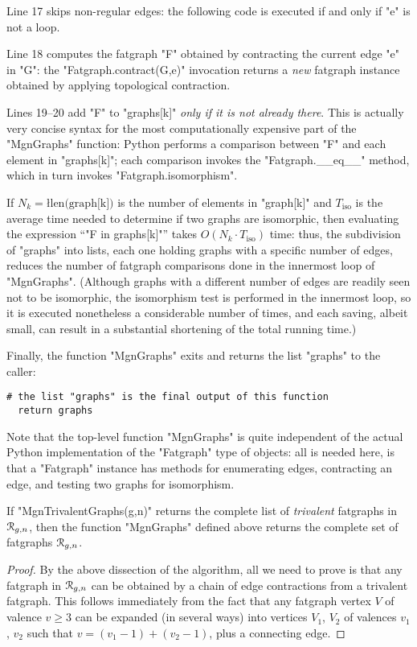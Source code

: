 Line 17 skips non-regular edges: the following code is executed if and
only if "e" is not a loop.

Line 18 computes the fatgraph "F" obtained by contracting the
current edge "e" in "G": the "Fatgraph.contract(G,e)" invocation
returns a \emph{new} fatgraph instance obtained by applying
topological contraction.

Lines 19--20 add "F" to "graphs[k]" \emph{only if it is not
  already there}.  This is actually very concise syntax for the most
computationally expensive part of the "MgnGraphs" function: Python
performs a comparison between "F" and each element in "graphs[k]";
each comparison invokes the "Fatgraph.__eq__" method, which in turn
invokes "Fatgraph.isomorphism".

If $N_k = \text{\l{len(graph[k])}}$ is the number of elements in
"graph[k]" and $T_\text{iso}$ is the average time needed to
determine if two graphs are isomorphic, then evaluating the expression
``"F in graphs[k]"'' takes $O(N_k \cdot T_\text{iso})$ time: thus, the
subdivision of "graphs" into lists, each one holding graphs with a
specific number of edges, reduces the number of fatgraph comparisons
done in the innermost loop of "MgnGraphs".  (Although graphs with a
different number of edges are readily seen not to be isomorphic, the
isomorphism test is performed in the innermost loop, so it is executed
nonetheless a considerable number of times, and each saving, albeit
small, can result in a substantial shortening of the total running
time.)

Finally, the function "MgnGraphs" exits and returns the list "graphs"
to the caller:
\begin{lstlisting}[name=MgnGraphs,firstnumber=21]
  # the list "graphs" is the final output of this function
  return graphs
\end{lstlisting}

Note that the top-level function "MgnGraphs" is quite independent of
the actual Python implementation of the "Fatgraph" type of objects:
all is needed here, is that a "Fatgraph" instance has methods for
enumerating edges, contracting an edge, and testing two graphs for
isomorphism.

\begin{lemma}
  If "MgnTrivalentGraphs(g,n)" returns the complete list of
  \emph{trivalent} fatgraphs in $\mathcal{R}_{g,n}$, then the function
  "MgnGraphs" defined above returns the complete set of fatgraphs
  $\mathcal{R}_{g,n}$.
\end{lemma}
\begin{proof}
  By the above dissection of the algorithm, all we need to prove is
  that any fatgraph in $\mathcal{R}_{g,n}$ can be obtained by a chain of edge
  contractions from a trivalent fatgraph.  This follows immediately
  from the fact that any fatgraph vertex $V$ of valence $v \geq 3$ can
  be expanded (in several ways) into vertices $V_1$, $V_2$ of valences
  $v_1$, $v_2$ such that $v = (v_1 -1) + (v_2 -1)$, plus a connecting
  edge.
\end{proof}


